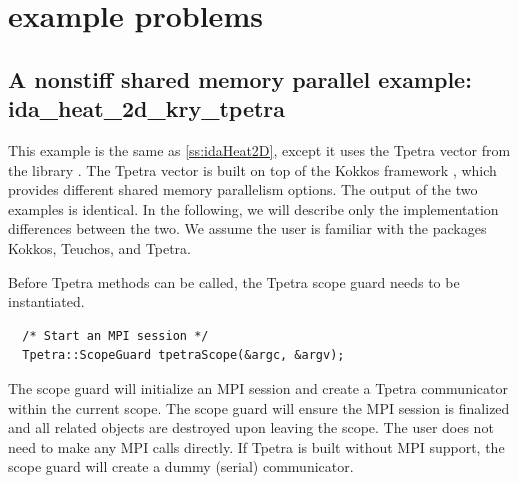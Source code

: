 \section{{\trilinos} example problems}\label{s:ex_trilinos}

\subsection{A nonstiff shared memory parallel example:  ida\_heat\_2d\_kry\_tpetra}
\label{ss:ida_heat_2d_kry_tpetra}

This example is the same as \ref{ss:idaHeat2D}, except it uses the
Tpetra \cite{hoemmen2015tpetra} vector from the {\trilinos} library \cite{Trilinos-Overview}. The Tpetra vector is built on top of the Kokkos
framework \cite{edwards2014kokkos}, which provides different shared memory parallelism options. The output of the
two examples is identical. In the following, we will describe only the implementation
differences between the two. We assume the user is familiar with the {\trilinos} packages
Kokkos, Teuchos, and Tpetra.

Before Tpetra methods can be called, the Tpetra scope guard needs to be instantiated. 
\begin{verbatim}
  /* Start an MPI session */
  Tpetra::ScopeGuard tpetraScope(&argc, &argv);
\end{verbatim}
The scope guard will initialize an MPI session and create a Tpetra communicator
within the current scope. The scope guard will ensure the MPI session is finalized
and all related objects are destroyed upon leaving the scope. The user does not need
to make any MPI calls directly. 
If Tpetra is built without MPI support, the scope guard will create a dummy
(serial) communicator.

